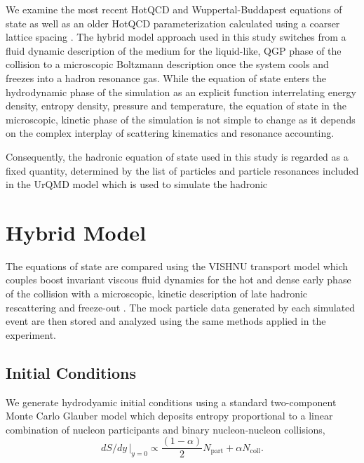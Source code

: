 \documentclass[aps,prc,reprint,amsmath,nofootinbib,superscriptaddress]{revtex4-1}
\begin{document}
We examine the most recent HotQCD and Wuppertal-Buddapest equations of state \cite{?} as well as an older HotQCD parameterization calculated using a coarser lattice spacing \cite{?}. The hybrid model approach used in this study switches
from a fluid dynamic description of the medium for the liquid-like, QGP phase of the collision to a microscopic Boltzmann description once 
the system cools and freezes into a hadron resonance gas. While the equation of state enters the hydrodynamic phase of the simulation as an 
explicit function interrelating energy density, entropy density, pressure and temperature, the equation of state in the microscopic, kinetic 
phase of the simulation is not simple to change as it depends on the complex interplay of scattering kinematics and resonance accounting.

Consequently, the hadronic equation of state used in this study is regarded as a fixed quantity, determined by the list of particles and particle 
resonances included in the UrQMD model which is used to simulate the hadronic 
\section{Hybrid Model}

The equations of state are compared using the VISHNU transport model which couples boost invariant viscous fluid dynamics \cite{?} for the hot 
and dense early phase of the collision with a microscopic, kinetic description of late hadronic rescattering and freeze-out \cite{?}. The mock 
particle data generated by each simulated event are then stored and analyzed using the same methods applied in the experiment.

\subsection{Initial Conditions}

We generate hydrodyamic initial conditions using a standard two-component Monte Carlo Glauber model which deposits entropy proportional to a linear 
combination of nucleon participants and binary nucleon-nucleon collisions,
\begin{equation}
 dS/dy \,\vert_{y=0} \propto \frac{(1-\alpha)}{2}N_\text{part} + \alpha N_\text{coll}.
 \label{twocomponent}
\end{equation}
\end{document}
